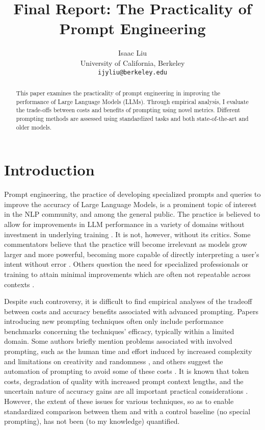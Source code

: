 \documentclass[11pt]{article}
\title{Final Report: The Practicality of Prompt Engineering}
\author{Isaac Liu \\
  University of California, Berkeley \\
  \texttt{ijyliu@berkeley.edu}}
\begin{document}
\maketitle
\begin{abstract}
  This paper examines the practicality of prompt engineering in improving the performance of Large Language Models (LLMs). Through empirical analysis, I evaluate the trade-offs between costs and benefits of prompting using novel metrics. Different prompting methods are assessed using standardized tasks and both state-of-the-art and older models.
\end{abstract}

\section*{Introduction}

Prompt engineering, the practice of developing specialized prompts and queries to improve the accuracy of Large Language Models, is a prominent topic of interest in the NLP community, and among the general public. The practice is believed to allow for improvements in LLM performance in a variety of domains without investment in underlying training \cite{martineau_what_2021}. It is not, however, without its critics. Some commentators believe that the practice will become irrelevant as models grow larger and more powerful, becoming more capable of directly interpreting a user's intent without error \cite{ethan_mollick_emollick_i_2023}. Others question the need for specialized professionals or training to attain minimal improvements which are often not repeatable across contexts \cite{shackell_prompt_2023, acar_ai_2023}. 

Despite such controversy, it is difficult to find empirical analyses of the tradeoff between costs and accuracy benefits associated with advanced prompting. Papers introducing new prompting techniques often only include performance benchmarks concerning the techniques' efficacy, typically within a limited domain. Some authors briefly mention problems associated with involved prompting, such as the human time and effort induced by increased complexity and limitations on creativity and randomness \cite{wu_ai_2022}, and others suggest the automation of prompting to avoid some of these costs \cite{diao_active_2023}. It is known that token costs, degradation of quality with increased prompt context lengths, and the uncertain nature of accuracy gains are all important practical considerations \cite{gao_prompt_2023}. However, the extent of these issues for various techniques, so as to enable standardized comparison between them and with a control baseline (no special prompting), has not been (to my knowledge) quantified.
\end{document}

